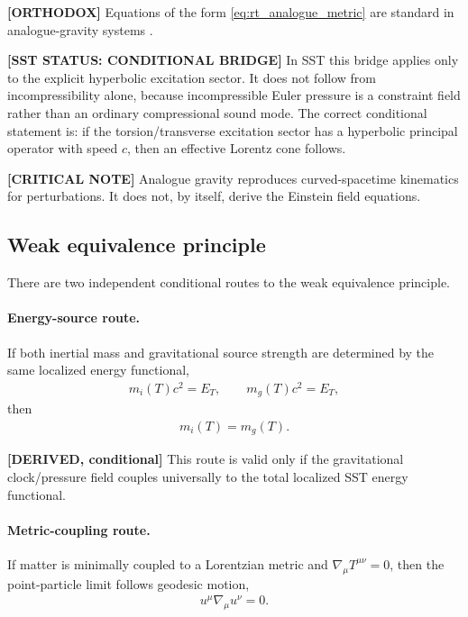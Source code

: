 \textbf{[ORTHODOX]} Equations of the form
\eqref{eq:rt_analogue_metric} are standard in analogue-gravity systems
\cite{Unruh1981,BarceloLiberatiVisser2011}.

\textbf{[SST STATUS: CONDITIONAL BRIDGE]} In SST this bridge applies only to the
explicit hyperbolic excitation sector. It does not follow from incompressibility
alone, because incompressible Euler pressure is a constraint field rather than
an ordinary compressional sound mode. The correct conditional statement is: if
the torsion/transverse excitation sector has a hyperbolic principal operator
with speed \(c\), then an effective Lorentz cone follows.

\textbf{[CRITICAL NOTE]} Analogue gravity reproduces curved-spacetime
kinematics for perturbations. It does not, by itself, derive the Einstein field
equations.

\subsection{Weak equivalence principle}

There are two independent conditional routes to the weak equivalence principle.

\paragraph{Energy-source route.}
If both inertial mass and gravitational source strength are determined by the
same localized energy functional,
\begin{align}
    m_i(T)c^2 = E_T,
    \qquad
    m_g(T)c^2 = E_T,
\end{align}
then
\begin{align}
    m_i(T)=m_g(T).
\end{align}

\textbf{[DERIVED, conditional]} This route is valid only if the gravitational
clock/pressure field couples universally to the total localized SST energy
functional.

\paragraph{Metric-coupling route.}
If matter is minimally coupled to a Lorentzian metric and
\(\nabla_\mu T^{\mu\nu}=0\), then the point-particle limit follows geodesic
motion,
\begin{align}
    u^\mu \nabla_\mu u^\nu =0 .
\end{align}

